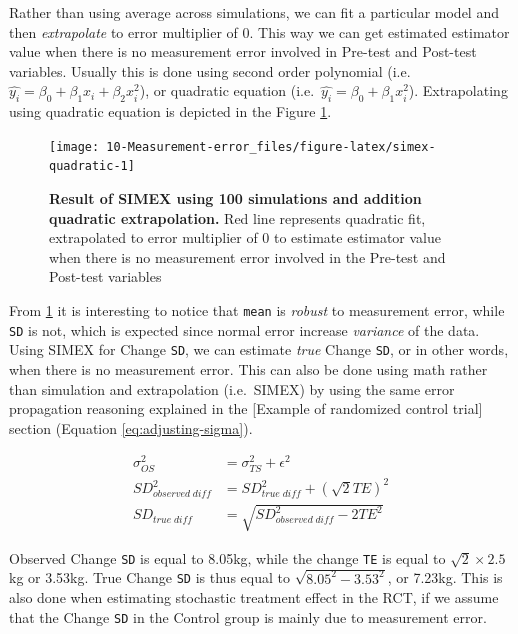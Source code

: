\documentclass[
]{book}
\begin{document}
Rather than using average across simulations, we can fit a particular model and then \emph{extrapolate} to error multiplier of 0. This way we can get estimated estimator value when there is no measurement error involved in Pre-test and Post-test variables. Usually this is done using second order polynomial (i.e.~\(\hat{y_i} = \beta_0 + \beta_1x_i + \beta_2x_i^2\)), or quadratic equation (i.e.~\(\hat{y_i} = \beta_0 + \beta_1x_i^2\)). Extrapolating using quadratic equation is depicted in the Figure \ref{fig:simex-quadratic}.

\begin{figure}

{\centering \texttt{[image: 10-Measurement-error\_files/figure-latex/simex-quadratic-1]} 

}

\caption{\textbf{Result of SIMEX using 100 simulations and addition quadratic extrapolation.} Red line represents quadratic fit, extrapolated to error multiplier of 0 to estimate estimator value when there is no measurement error involved in the Pre-test and Post-test variables}\label{fig:simex-quadratic}
\end{figure}



From \ref{fig:simex-quadratic} it is interesting to notice that \texttt{mean} is \emph{robust} to measurement error, while \texttt{SD} is not, which is expected since normal error increase \emph{variance} of the data. Using SIMEX for Change \texttt{SD}, we can estimate \emph{true} Change \texttt{SD}, or in other words, when there is no measurement error. This can also be done using math rather than simulation and extrapolation (i.e.~SIMEX) by using the same error propagation reasoning explained in the {[}Example of randomized control trial{]} section (Equation \eqref{eq:adjusting-sigma}).

\begin{equation}
  \begin{split}
    \sigma_{OS}^2 &= \sigma_{TS}^2 + \epsilon^2 \\
    SD_{observed \; diff}^2 &= SD_{true \; diff}^2 + (\sqrt{2}TE)^2 \\
    SD_{true \; diff} &= \sqrt{SD_{observed \; diff}^2 - 2TE^2}
  \end{split}
    \label{eq:adjusting-sigma}
\end{equation}

Observed Change \texttt{SD} is equal to 8.05kg, while the change \texttt{TE} is equal to \(\sqrt{2} \times 2.5\)kg or 3.53kg. True Change \texttt{SD} is thus equal to \(\sqrt{8.05^2 - 3.53^2 }\), or 7.23kg. This is also done when estimating stochastic treatment effect in the RCT, if we assume that the Change \texttt{SD} in the Control group is mainly due to measurement error.
\end{document}
